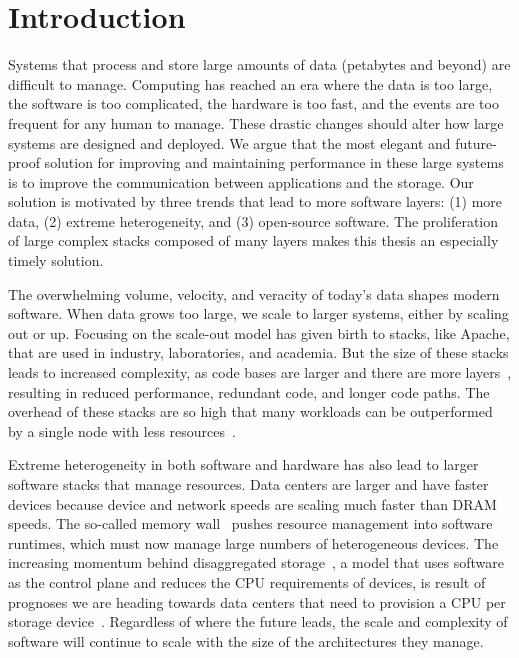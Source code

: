 \chapter{Introduction}

Systems that process and store large amounts of data (petabytes and beyond) are
difficult to manage. Computing has reached an era where the data is too large,
the software is too complicated, the hardware is too fast, and the events are
too frequent for any human to manage. These drastic changes should alter how
large systems are designed and deployed. We argue that the most elegant and
future-proof solution for improving and maintaining performance in these large
systems is to improve the communication between applications and the storage.
Our solution is  motivated by three trends that lead to more software layers:
(1) more data, (2) extreme heterogeneity, and (3) open-source software.  The
proliferation of large complex stacks composed of many layers makes this thesis
an especially timely solution.

The overwhelming volume, velocity, and veracity of today's data shapes
modern software. When data grows too large, we scale to larger systems, either
by scaling out or up. Focusing on the scale-out model has given birth to
stacks, like Apache, that are used in industry, laboratories, and academia. But
the size of these stacks leads to increased complexity, as code bases are
larger and there are more layers~\cite{sevilla:eurosys17-malacology}, resulting
in reduced performance, redundant code, and longer code paths. The overhead of
these stacks are so high that many workloads can be outperformed by a single
node with less resources~\cite{sevilla:discs2013-framework,
rowstron:hotcdp2012-hadoop-vs-single-node, schwarzkopf:hotcloud2012-7-sins,
gigaspaces:whitepaper2011-su-vs-so, michael:2007pdps-scale-up-x-scale-out}.

Extreme heterogeneity in both software and hardware has also lead to larger
software stacks that manage resources. Data centers are larger and have faster
devices because device and network speeds are scaling much faster than DRAM
speeds. The so-called memory wall~\cite{wulf:sigarch1995-memory-wall} pushes
resource management into software runtimes, which must now manage large numbers
of heterogeneous devices. The increasing momentum behind disaggregated
storage~\cite{klimovic:asplos2017-reflex, klimovic:eurosys16-disagg}, a model
that uses software as the control plane and reduces the CPU requirements of
devices, is result of prognoses we are heading towards data centers that need
to provision a CPU per storage device~\cite{samuels:oss16}. Regardless of where
the future leads, the scale and complexity of software will continue to scale
with the size of the architectures they manage.

